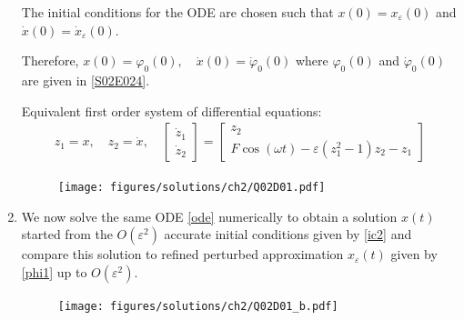 \begin{solution}[2.4]
\begin{enumerate}
The initial conditions for the ODE are chosen such that $x(0) = x_\varepsilon(0)$ and $\dot{x}(0) = \dot{x}_\varepsilon(0)$.

Therefore, $x(0)=\varphi_0(0), \quad \dot{x}(0) = \dot{\varphi}_0(0)$ where $\varphi_0(0)$ and $\dot{\varphi}_0(0)$ are given in \eqref{S02E024}.

Equivalent first order system of differential equations:
\begin{align}
\label{ode}
	z_1 = x, \quad z_2 = \dot{x}, \quad \begin{bmatrix}
		\dot{z}_1 \\
		\dot{z}_2
	\end{bmatrix} = \begin{bmatrix}
		z_2 \\
		F\cos(\omega t) - \varepsilon(z_1^2 - 1)z_2 - z_1
	\end{bmatrix}
\end{align}
\begin{figure}[h]
	\centering
	\texttt{[image: figures/solutions/ch2/Q02D01.pdf]}
\end{figure}

\item We now solve the same ODE \eqref{ode} numerically to obtain a solution $x(t)$ started from the $O(\varepsilon^2)$ accurate initial conditions given by \eqref{ic2} and compare this solution to refined perturbed approximation $x_\varepsilon(t)$ given by \eqref{phi1} up to $O(\varepsilon^2)$.

\begin{figure}[h]
	\centering
	\texttt{[image: figures/solutions/ch2/Q02D01\_b.pdf]}
\end{figure}

\end{enumerate}
\end{solution}


